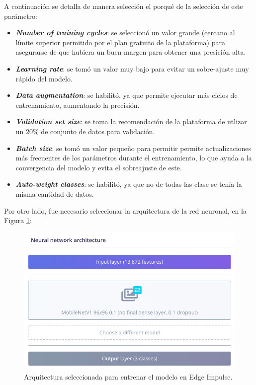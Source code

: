 A continuación se detalla de manera selección el porqué de la selección de este parámetro: 

\begin{itemize}
    \item \textit{\textbf{Number of training cycles}}: se seleccionó un valor grande (cercano al límite superior permitido por el plan gratuito de la plataforma) para asegurarse de que hubiera un buen margen para obtener una presición alta. 

    \item \textit{\textbf{Learning rate}}: se tomó un valor muy bajo para evitar un sobre-ajuste muy rápido del modelo.

    \item \textit{\textbf{Data augmentation}}: se habilitó, ya que permite ejecutar más ciclos de entrenamiento, aumentando la precisión. 

    \item \textit{\textbf{Validation set size}}: se toma la recomendación de la plataforma de utlizar un 20\% de conjunto de datos para validación. 

    \item \textit{\textbf{Batch size}}: se tomó un valor pequeño para permitir permite actualizaciones más frecuentes de los parámetros durante el entrenamiento, lo que ayuda a la convergencia del modelo y evita el sobreajuste de este.

    \item \textit{\textbf{Auto-weight classes}}: se habilitó, ya que no de todas las clase se tenía la misma cantidad de datos. 
\end{itemize}

Por otro lado, fue necesario seleccionar la arquitectura de la red neuronal, en la Figura \ref{fig:ANN}: 

\begin{figure}[H]
\centering
\includegraphics[width=120mm]{./Figuras/Desarrollo_Analisis/ANN}
\caption{Arquitectura seleccionada para entrenar el modelo en Edge Impulse.} 
\label{fig:ANN}
\end{figure}

